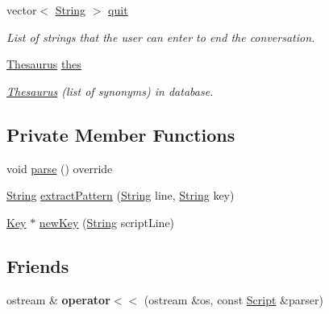 \begin{DoxyCompactItemize}
\mbox{\label{classScript_a187f8b939336ed6f1a5b7cf44526eacf}} 
vector$<$ \mbox{\hyperlink{classString}{String}} $>$ \mbox{\hyperlink{classScript_a187f8b939336ed6f1a5b7cf44526eacf}{quit}}
\begin{DoxyCompactList}\small\item\em List of strings that the user can enter to end the conversation. \end{DoxyCompactList}\item 
\mbox{\label{classScript_afaaa5f986fb3638e31c51231408cfbeb}} 
\mbox{\hyperlink{classThesaurus}{Thesaurus}} \mbox{\hyperlink{classScript_afaaa5f986fb3638e31c51231408cfbeb}{thes}}
\begin{DoxyCompactList}\small\item\em \mbox{\hyperlink{classThesaurus}{Thesaurus}} (list of synonyms) in database. \end{DoxyCompactList}\end{DoxyCompactItemize}
\subsection*{Private Member Functions}
\begin{DoxyCompactItemize}
\item 
void \mbox{\hyperlink{classScript_a4bb2f5d77aed84a9f0dc9298894abd1c}{parse}} () override
\item 
\mbox{\hyperlink{classString}{String}} \mbox{\hyperlink{classScript_a946d037839b4caada09e22a428c8f42e}{extract\+Pattern}} (\mbox{\hyperlink{classString}{String}} line, \mbox{\hyperlink{classString}{String}} key)
\item 
\mbox{\hyperlink{classKey}{Key}} $\ast$ \mbox{\hyperlink{classScript_a5edeec2fa0d7e46e0795715810a031d8}{new\+Key}} (\mbox{\hyperlink{classString}{String}} script\+Line)
\end{DoxyCompactItemize}
\subsection*{Friends}
\begin{DoxyCompactItemize}
\item 
\mbox{\label{classScript_a28fbd10cd3ac6e431b96d64453c23dec}} 
ostream \& {\bfseries operator$<$$<$} (ostream \&os, const \mbox{\hyperlink{classScript}{Script}} \&parser)
\end{DoxyCompactItemize}
